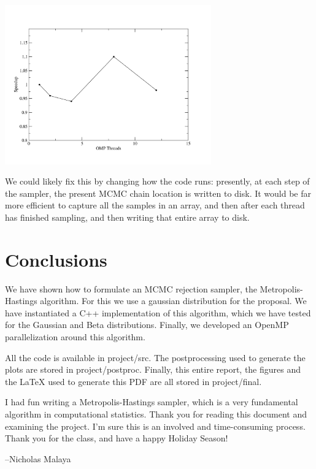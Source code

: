 \documentclass{article}
\begin{document}
\begin{center}
  \includegraphics[width=3.5in]{figs/data}
\end{center}


We could likely fix this by changing how the code runs: presently, at each step of the sampler, the present
MCMC chain location is written to disk. It would be far more efficient to capture all the samples
in an array, and then after each thread has finished sampling, and then writing that entire array to disk. 

\section{Conclusions}

We have shown how to formulate an MCMC rejection sampler, the Metropolis-Hastings algorithm. For this we use a gaussian distribution for the proposal. We have instantiated a C++ implementation 
of this algorithm, which we have tested for the Gaussian and Beta distributions. Finally, we developed an OpenMP parallelization around this algorithm. 

All the code is available in project/src. The postprocessing used to generate the plots are stored in project/postproc. Finally, this entire report, the figures and the LaTeX used to generate this PDF 
are all stored in project/final. 

I had fun writing a Metropolis-Hastings sampler, which is a very fundamental algorithm in computational 
statistics. Thank you for reading this document and examining the project. I'm sure this is an involved and time-consuming process. Thank you for the class, and have a happy Holiday Season!

--Nicholas Malaya
\end{document}

